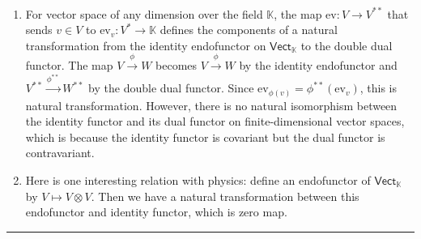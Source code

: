 \begin{exmp}
~\begin{enumerate}
\item For vector space of any dimension over the field $\mathbb{K}$, the map $\mathrm{ev}:V\rightarrow V^{**}$ that sends $v\in V$ to $\mathrm{ev}_v:V^*\rightarrow \mathbb{K}$ defines the components of a natural transformation from the identity endofunctor on $\mathsf{Vect}_{\mathbb{K}}$ to the double dual functor. The map $V\xrightarrow{\phi}W$ becomes $V\xrightarrow{\phi}W$ by the identity endofunctor and $V^{**}\xrightarrow{\phi^{**}}W^{**}$ by the double dual functor. Since $\mathrm{ev}_{\phi (v)}=\phi^{**}(\mathrm{ev}_v)$, this is natural transformation. However, there is no natural isomorphism between the identity functor and its dual functor on finite-dimensional vector spaces, which is because the identity functor is covariant but the dual functor is contravariant.
\item Here is one interesting relation with physics: define an endofunctor of $\mathsf{Vect}_{\mathbb{K}}$ by $V\mapsto V\otimes V$. Then we have a natural transformation between this endofunctor and identity functor, which is zero map. 
\end{enumerate}
\end{exmp}
\noindent\rule{\textwidth}{1pt}
\newline
